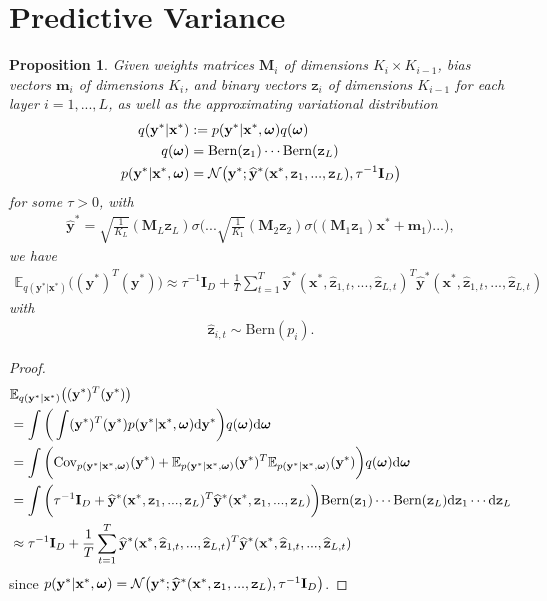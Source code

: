 \documentclass{article} %
\newcommand{\N}{\mathcal{N}}
\newcommand{\td}{\text{d}}
\newcommand{\x}{\mathbf{x}}
\newcommand{\sBb}{\mathtt{z}}
\newcommand{\y}{\mathbf{y}}
\newcommand{\m}{\mathbf{m}}
\newcommand{\I}{\mathbf{I}}
\newcommand{\M}{\mathbf{M}}
\newcommand{\bo}{\text{\boldmath$\omega$}}
\newcommand{\Cov}{\text{Cov}}
\newtheorem{proposition}{Proposition}
\theoremstyle{definition}
\begin{document}
\section{Predictive Variance}
\begin{proposition} \label{prop:var}
Given weights matrices $\M_i$ of dimensions $K_i \times K_{i-1}$, bias vectors $\m_i$ of dimensions $K_i$, and binary vectors $\sBb_i$ of dimensions $K_{i-1}$ for each layer $i = 1, ..., L$, as well as the approximating variational distribution
\begin{align*}
q(\y^* | \x^*) &:= p(\y^* | \x^*, \bo) q(\bo) \\
q(\bo) &= \text{Bern}(\sBb_1) \cdots \text{Bern}(\sBb_L) \\
p(\y^* | \x^*, \bo) &= \N \big( \y^*; \widehat{\y}^*(\x^*, \sBb_1, ..., \sBb_L), \tau^{-1} \I_D \big) 
\end{align*}
for some $\tau > 0$, with 
\begin{align*}
\widehat{\y}^* = \sqrt{\frac{1}{K_L}} (\M_L \sBb_L) \sigma \bigg( ... \sqrt{\frac{1}{K_1}} (\M_2 \sBb_2) \sigma \big( (\M_1 \sBb_1) \x^* + \m_1 \big) ... \bigg),
\end{align*}
we have 
\begin{align*}
\mathbb{E}_{q(\y^* | \x^*)} \big( (\y^*)^T(\y^*) \big) \approx \tau^{-1} \I_D + \frac{1}{T} \sum_{t=1}^T \widehat{\y}^*(\x^*, \widehat{\sBb}_{1,t}, ..., \widehat{\sBb}_{L,t})^T \widehat{\y}^*(\x^*, \widehat{\sBb}_{1,t}, ..., \widehat{\sBb}_{L,t})
\end{align*}
with 
\begin{align*}
\widehat{\sBb}_{i,t} \sim \text{Bern}(p_i).
\end{align*}
\end{proposition}
\begin{proof}
\begin{align*}
&\mathbb{E}_{q(\y^* | \x^*)} \big( (\y^*)^T(\y^*) \big) \\
&= \int \bigg( \int (\y^*)^T(\y^*) p(\y^* | \x^*, \bo) \td \y^* \bigg) q(\bo) \td \bo \\ 
&= \int \bigg( \Cov_{p(\y^* | \x^*, \bo)}(\y^*) + \mathbb{E}_{p(\y^* | \x^*, \bo)} (\y^*)^T \mathbb{E}_{p(\y^* | \x^*, \bo)} (\y^*) \bigg) q(\bo) \td \bo \\ 
&= \int \bigg( \tau^{-1} \I_D + \widehat{\y}^*(\x^*, \sBb_1, ..., \sBb_L)^T \widehat{\y}^*(\x^*, \sBb_1, ..., \sBb_L) \bigg) \text{Bern}(\sBb_1) \cdots \text{Bern}(\sBb_L) \td \sBb_1 \cdots \td \sBb_L \\
&\approx \tau^{-1} \I_D + \frac{1}{T} \sum_{t=1}^T \widehat{\y}^*(\x^*, \widehat{\sBb}_{1,t}, ..., \widehat{\sBb}_{L,t})^T \widehat{\y}^*(\x^*, \widehat{\sBb}_{1,t}, ..., \widehat{\sBb}_{L,t})
\end{align*}
since $p(\y^* | \x^*, \bo) = \N \big( \y^*; \widehat{\y}^*(\x^*, \sBb_1, ..., \sBb_L), \tau^{-1} \I_D \big)$.
\end{proof}
\end{document}

